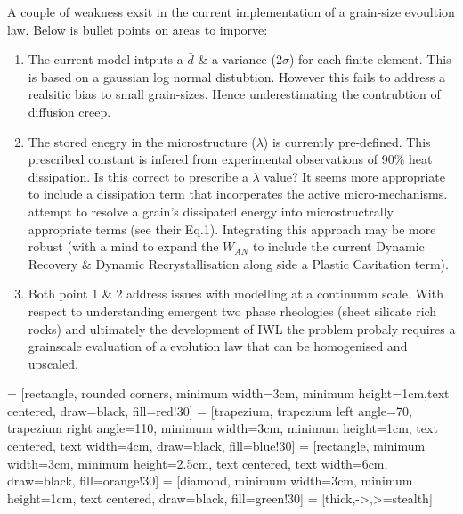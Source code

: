 \documentclass[]{scrreprt}
\begin{document}
A couple of weakness exsit in the current implementation of a grain-size evoultion law. Below is bullet points on areas to imporve:

\begin{enumerate}
\item The current model intputs a $\bar{d}$ \& a variance (2$\sigma$) for each finite element. This is based on a gaussian log normal distubtion. However this fails to address a realsitic bias to small grain-sizes. Hence underestimating the contrubtion of diffusion creep. 
\item The stored enegry in the microstructure ($\lambda$) is currently pre-defined. This prescribed constant is infered from experimental observations of 90\% heat dissipation. Is this correct to prescribe a $\lambda$ value? It seems more appropriate to include a dissipation term that incorperates the active micro-mechanisms. \citet{Huang2009} attempt to resolve a grain's dissipated energy into microstructrally appropriate terms (see their Eq.1). Integrating this approach may be more robust (with a mind to expand the $W_{AN}$ to include the current Dynamic Recovery \& Dynamic Recrystallisation along side a Plastic Cavitation term).
\item Both point 1 \& 2 address issues with modelling at a continumm scale. With respect to understanding emergent two phase rheologies (sheet silicate rich rocks) and ultimately the development of IWL \citep{Handy1994} the problem probaly requires a grainscale evaluation of a evolution law that can be homogenised and upscaled.
\end{enumerate}


 = [rectangle, rounded corners, minimum width=3cm, minimum height=1cm,text centered, draw=black, fill=red!30]
 = [trapezium, trapezium left angle=70, trapezium right angle=110, minimum width=3cm, minimum height=1cm, text centered, text width=4cm, draw=black, fill=blue!30]
 = [rectangle, minimum width=3cm, minimum height=2.5cm, text centered, text width=6cm, draw=black, fill=orange!30]
 = [diamond, minimum width=3cm, minimum height=1cm, text centered, draw=black, fill=green!30]
 = [thick,->,>=stealth]
\end{document}
